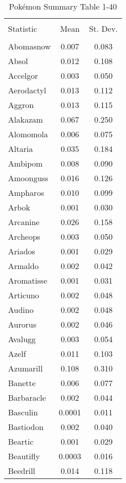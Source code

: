 \documentclass[12pt,twoside]{reedthesis}
\begin{document}
  \begin{table}[!htbp] \centering 
    \caption{Pokémon Summary Table 1-40} 
    \label{} 
  \begin{tabular}{@{\extracolsep{5pt}}lcc} 
  \\[-1.8ex]\hline 
  \hline \\[-1.8ex] 
  Statistic & \multicolumn{1}{c}{Mean} & \multicolumn{1}{c}{St. Dev.} \\ 
  \hline \\[-1.8ex] 
  Abomasnow & 0.007 & 0.083 \\ 
  Absol & 0.012 & 0.108 \\ 
  Accelgor & 0.003 & 0.050 \\ 
  Aerodactyl & 0.013 & 0.112 \\ 
  Aggron & 0.013 & 0.115 \\ 
  Alakazam & 0.067 & 0.250 \\ 
  Alomomola & 0.006 & 0.075 \\ 
  Altaria & 0.035 & 0.184 \\ 
  Ambipom & 0.008 & 0.090 \\ 
  Amoonguss & 0.016 & 0.126 \\ 
  Ampharos & 0.010 & 0.099 \\ 
  Arbok & 0.001 & 0.030 \\ 
  Arcanine & 0.026 & 0.158 \\ 
  Archeops & 0.003 & 0.050 \\ 
  Ariados & 0.001 & 0.029 \\ 
  Armaldo & 0.002 & 0.042 \\ 
  Aromatisse & 0.001 & 0.031 \\ 
  Articuno & 0.002 & 0.048 \\ 
  Audino & 0.002 & 0.048 \\ 
  Aurorus & 0.002 & 0.046 \\ 
  Avalugg & 0.003 & 0.054 \\ 
  Azelf & 0.011 & 0.103 \\ 
  Azumarill & 0.108 & 0.310 \\ 
  Banette & 0.006 & 0.077 \\ 
  Barbaracle & 0.002 & 0.044 \\ 
  Basculin & 0.0001 & 0.011 \\ 
  Bastiodon & 0.002 & 0.040 \\ 
  Beartic & 0.001 & 0.029 \\ 
  Beautifly & 0.0003 & 0.016 \\ 
  Beedrill & 0.014 & 0.118 \\ 

\end{tabular}
\end{table}
\end{document}
